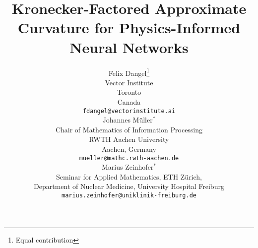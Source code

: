 \newcommand{\papertitle}{%
  Kronecker-Factored Approximate Curvature for Physics-Informed Neural Networks
}
\title{\papertitle}

%

\author{%
  Felix Dangel\thanks{Equal contribution}\\
  Vector Institute \\
  Toronto \\ Canada \\
  \texttt{fdangel@vectorinstitute.ai} \\
  \And
  Johannes M\"uller$^*$\\
  Chair of Mathematics of Information Processing \\
  RWTH Aachen University \\
  Aachen, Germany \\
  \texttt{mueller@mathc.rwth-aachen.de} \\
  \And
  Marius Zeinhofer$^*$\\
  Seminar for Applied Mathematics, ETH Z\"urich, \\
  Department of Nuclear Medicine, University Hospital Freiburg\\
  \texttt{marius.zeinhofer@uniklinik-freiburg.de}
}
